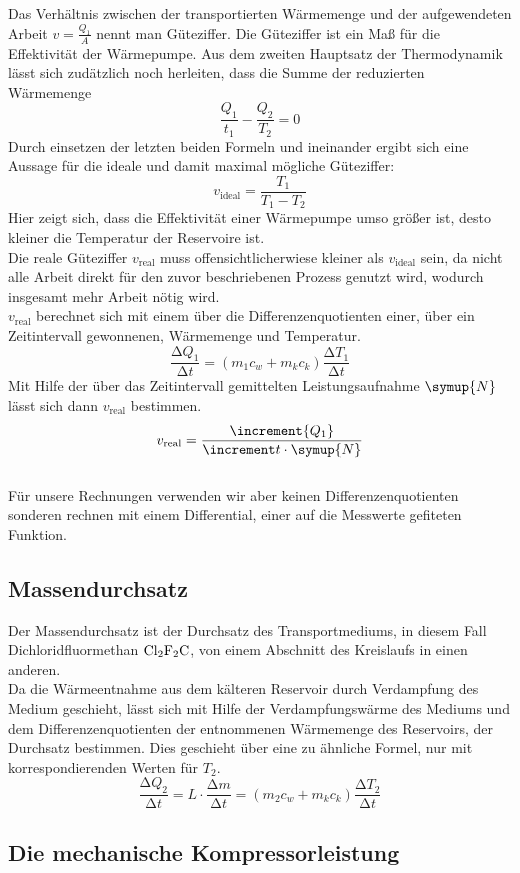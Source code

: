 Das Verhältnis zwischen der transportierten Wärmemenge und der 
aufgewendeten Arbeit $v=\frac{Q_1}{A}$ nennt man Güteziffer.
Die Güteziffer ist ein Maß für die Effektivität der Wärmepumpe.
Aus dem zweiten Hauptsatz der Thermodynamik lässt sich zudätzlich noch herleiten,
dass die Summe der reduzierten Wärmemenge 
\begin{equation}
    \frac{Q_1}{t_1}-\frac{Q_2}{T_2}=0
\end{equation}
Durch einsetzen der letzten beiden Formeln und  ineinander
ergibt sich eine Aussage für die ideale und damit maximal mögliche Güteziffer:
\begin{equation}
    v_\text{ideal}= \frac{T_1}{T_1-T_2}
    \label{eqn:videal}
\end{equation}
Hier zeigt sich, dass die Effektivität einer Wärmepumpe
umso größer ist, desto kleiner die Temperatur der Reservoire ist. \\
Die reale Güteziffer $v_\text{real}$ muss offensichtlicherwiese
kleiner als $v_\text{ideal}$ sein, da nicht alle Arbeit direkt für den zuvor 
beschriebenen Prozess genutzt wird, wodurch insgesamt mehr Arbeit nötig wird.\\
$v_\text{real}$ berechnet sich mit einem über die Differenzenquotienten
einer, über ein Zeitintervall gewonnenen, Wärmemenge und Temperatur.
\begin{equation}
    \frac{\increment Q_1}{\increment t} = \left(m_1 c_w + m_k c_k \right)\frac{\increment T_1}{\increment t}
    \label{eqn:delQ}
\end{equation}
Mit Hilfe der über das Zeitintervall gemittelten Leistungsaufnahme $\symup{N}$
lässt sich dann $v_\text{real}$ bestimmen.
\begin{equation}
    v_\text{real}= \frac{\increment{Q_1}}{\increment t \cdot \symup{N} }
    \label{eqn:vreal1}
\end{equation}\\
Für unsere Rechnungen verwenden wir aber keinen Differenzenquotienten sonderen rechnen mit einem Differential,
einer auf die Messwerte gefiteten Funktion.

\subsection{Massendurchsatz}

Der Massendurchsatz ist der Durchsatz des Transportmediums, in diesem Fall
Dichloridfluormethan $\ce{Cl2F2C}$, von einem Abschnitt des Kreislaufs in einen anderen.\\
Da die Wärmeentnahme aus dem kälteren Reservoir durch Verdampfung des Medium geschieht, 
lässt sich mit Hilfe der Verdampfungswärme des Mediums und dem Differenzenquotienten 
der entnommenen Wärmemenge des Reservoirs, der Durchsatz bestimmen.
Dies geschieht über eine zu  ähnliche Formel, nur mit korrespondierenden
Werten für $T_2$.
\begin{equation}
    \frac{\increment Q_2}{\increment t} = L\cdot \frac{\increment m}{\increment t}
    = \left(m_2 c_w + m_k c_k \right)\frac{\increment T_2}{\increment t}
\end{equation}

\subsection{Die mechanische Kompressorleistung}










